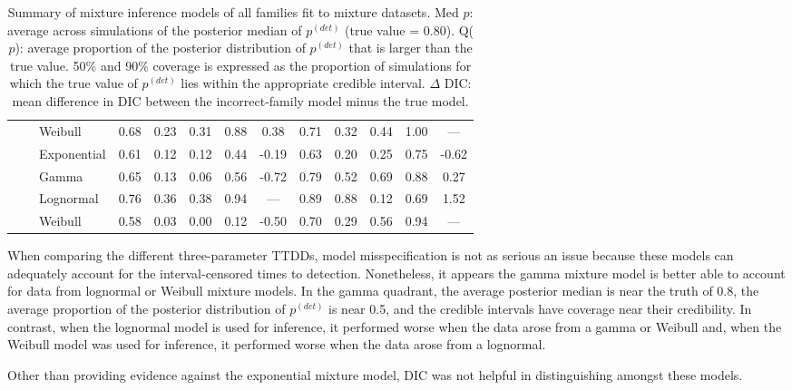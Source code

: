 \documentclass[useAMS,usenatbib,referee,12pt]{article}
\newcommand{\pdet}{p^{(det)}}
\begin{document}
\begin{table}[ht]
\begin{tabular}{l|l|l|ccccc|ccccc}
& &   Weibull & 0.68 & 0.23 & 0.31 & 0.88 & 0.38 & 0.71 & 0.32 & 0.44 & 1.00 & --- \\ 
\cline{2-13}
& &   Exponential & 0.61 & 0.12 & 0.12 & 0.44 & -0.19 & 0.63 & 0.20 & 0.25 & 0.75 & -0.62 \\ 
\cline{2-13}
& \parbox[t]{2mm}{} & Gamma & 0.65 & 0.13 & 0.06 & 0.56 & -0.72 & 0.79 & 0.52 & 0.69 & 0.88 & 0.27 \\ 
& &   Lognormal & 0.76 & 0.36 & 0.38 & 0.94 & --- & 0.89 & 0.88 & 0.12 & 0.69 & 1.52 \\ 
& &   Weibull & 0.58 & 0.03 & 0.00 & 0.12 & -0.50 & 0.70 & 0.29 & 0.56 & 0.94 & --- \\ 
   \hline
\end{tabular}
\caption{Summary of mixture inference models of all families fit to mixture datasets.  
Med $p$: average across simulations of the posterior median of $\pdet$ (true value = 0.80).  
Q($p$): average proportion of the posterior distribution of $\pdet$ that is larger than the true value.  
50\% and 90\% coverage is expressed as the proportion of simulations for which the true value of $\pdet$ lies within the appropriate credible interval.  
$\Delta$ DIC: mean difference in DIC between the incorrect-family model minus the true model.}
\label{tbl:sim2}
\end{table}

When comparing the different three-parameter TTDDs, model misspecification is not as serious an issue because these models can adequately account for the interval-censored times to detection. 
Nonetheless, it appears the gamma mixture model is better able to account for data from lognormal or Weibull mixture models. 
In the gamma quadrant, the average posterior median is near the truth of 0.8, the average proportion of the posterior distribution of $\pdet$ is near 0.5, and the credible intervals have coverage near their credibility. 
In contrast, when the lognormal model is used for inference, it performed worse when the data arose from a gamma or Weibull and, when the Weibull model was used for inference, it performed worse when the data arose from a lognormal. 

Other than providing evidence against the exponential mixture model, DIC was not helpful in distinguishing amongst these models. 
\end{document}

